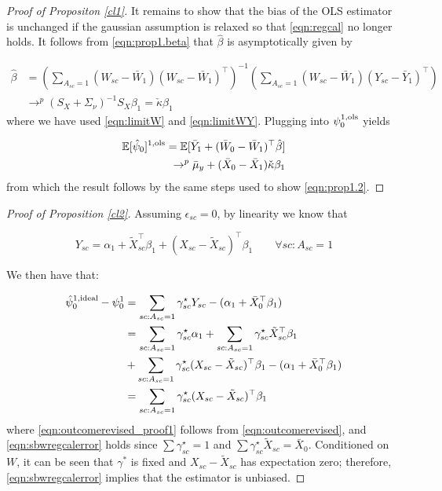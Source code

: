 \begin{proof}[Proof of Propositon \ref{cl1}]
It remains to show that the bias of the OLS estimator is unchanged if the gaussian assumption is relaxed so that \eqref{eqn:regcal} no longer holds. It follows from \eqref{eqn:prop1.beta} that $\hat{\beta}$ is asymptotically given by

    \begin{align*}
    \hat{\beta} &= \left(\sum_{A_{sc}=1} (W_{sc} - \bar{W}_1)(W_{sc} - \bar{W}_1)^\top \right)^{-1} \left(\sum_{A_{sc}=1} (W_{sc} - \bar{W}_1)(Y_{sc} - \bar{Y}_1)^\top\right) \\
     & \rightarrow^p  (S_X + \Sigma_\nu)^{-1}S_X \beta_1 = \check{\kappa} \beta_1
    \end{align*}
where we have used \eqref{eqn:limitW} and \eqref{eqn:limitWY}. Plugging into $\psi_0^{1,\textup{ols}}$ yields

\begin{align*}    
    \mathbb{E}[\hat{\psi}_0]^{1,\textup{ols}} = \mathbb{E}[ \bar{Y}_1 + (\bar{W}_0 - \bar{W}_1)^\top \hat{\beta}] \\
    \rightarrow^p  \bar{\mu}_y + (\bar{X}_0 - \bar{X}_1)\check{\kappa} \beta_1
\end{align*}
from which the result follows by the same steps used to show \eqref{eqn:prop1.2}.

\end{proof}

\begin{proof}[Proof of Proposition \ref{cl2}]
Assuming $\epsilon_{sc} = 0$, by linearity we know that

\begin{equation}\label{eqn:outcomerevised}
Y_{sc} = \alpha_1 + \tilde{X}_{sc}^\top \beta_1 + (X_{sc} - \tilde{X}_{sc})^\top \beta_1 \qquad \forall sc: A_{sc} = 1
\end{equation}

We then have that:

\begin{align}\nonumber
    \hat{\psi}_0^{1,\textup{ideal}} - \psi_0^1 &= \sum_{sc: A_{sc} = 1}\gamma_{sc}^\star Y_{sc} - (\alpha_1 + \bar{X}_0^\top \beta_1) \\
    \nonumber &= \sum_{sc: A_{sc} = 1}\gamma_{sc}^\star\alpha_1 + \sum_{sc: A_{sc} = 1}\gamma_{sc}^\star\tilde{X}_{sc}^\top \beta_1 \\ 
    &+ \sum_{sc: A_{sc} = 1}\gamma_{sc}^\star(X_{sc} - \tilde{X}_{sc})^\top \beta_1 - (\alpha_1 + \bar{X}_0^\top \beta_1) \label{eqn:outcomerevised_proof1}\\
    &= \sum_{sc: A_{sc} = 1}\gamma_{sc}^\star(X_{sc} - \tilde{X}_{sc})^\top \beta_1\label{eqn:sbwregcalerror}
\end{align}
where \eqref{eqn:outcomerevised_proof1} follows from \eqref{eqn:outcomerevised}, and \eqref{eqn:sbwregcalerror} holds since $\sum \gamma_{sc}^\star = 1$ and $\sum \gamma_{sc}^\star \tilde{X}_{sc} = \bar{X}_0$. Conditioned on $W$, it can be seen that $\gamma^*$ is fixed and $X_{sc} - \tilde{X}_{sc}$ has expectation zero; therefore, \eqref{eqn:sbwregcalerror} implies that the estimator is unbiased.
\end{proof}

